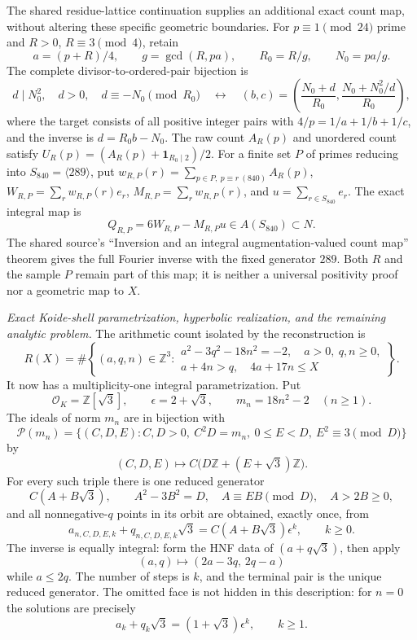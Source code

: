 \documentclass[10pt,letterpaper]{article}
\begin{document}
The shared residue-lattice continuation supplies an additional exact
count map, without altering these specific geometric boundaries.
For $p\equiv1\pmod{24}$ prime and $R>0$, $R\equiv3\pmod4$, retain
\[
 a=(p+R)/4,\qquad g=\gcd(R,pa),\qquad R_0=R/g,\qquad N_0=pa/g.
\]
The complete divisor-to-ordered-pair bijection is
\[
 d\mid N_0^2,\quad d>0,\quad d\equiv-N_0\pmod{R_0}
 \quad\longleftrightarrow\quad
 (b,c)=\left(\frac{N_0+d}{R_0},\frac{N_0+N_0^2/d}{R_0}\right),
\]
where the target consists of all positive integer pairs with
$4/p=1/a+1/b+1/c$, and the inverse is $d=R_0b-N_0$.
The raw count $A_R(p)$ and unordered count satisfy
$U_R(p)=(A_R(p)+\mathbf1_{R_0\mid2})/2$.
For a finite set $P$ of primes reducing into $S_{840}=\langle289\rangle$,
put $w_{R,P}(r)=\sum_{p\in P,\ p\equiv r\ (840)}A_R(p)$,
$W_{R,P}=\sum_r w_{R,P}(r)e_r$, $M_{R,P}=\sum_r w_{R,P}(r)$,
and $u=\sum_{r\in S_{840}}e_r$. The exact integral map is
\[
 Q_{R,P}=6W_{R,P}-M_{R,P}u\in A(S_{840})\subset N.
\]
The shared source's ``Inversion and an integral augmentation-valued
count map'' theorem gives the full Fourier inverse with the fixed
generator $289$. Both $R$ and the sample $P$ remain part of this map;
it is neither a universal positivity proof nor a geometric map to $X$.

\medskip\noindent
\textit{Exact Koide-shell parametrization, hyperbolic realization, and the
remaining analytic problem.}
The arithmetic count isolated by the reconstruction is
\[
 R(X)=\#\left\{(a,q,n)\in\mathbb Z^3:
 \begin{array}{c}
 a^2-3q^2-18n^2=-2,\quad a>0,\ q,n\geq0,\\
 a+4n>q,\quad 4a+17n\leq X
 \end{array}\right\}.
\]
It now has a multiplicity-one integral parametrization.  Put
\[
 \mathcal O_K=\mathbb Z[\sqrt3],\qquad
 \epsilon=2+\sqrt3,\qquad m_n=18n^2-2\quad(n\geq1).
\]
The ideals of norm $m_n$ are in bijection with
\[
 \mathcal P(m_n)=\{(C,D,E):C,D>0,\ C^2D=m_n,\ 0\leq E<D,
                         \ E^2\equiv3\pmod D\}
\]
by
\[
 (C,D,E)\longmapsto C\bigl(D\mathbb Z+(E+\sqrt3)\mathbb Z\bigr).
\]
For every such triple there is one reduced generator
\[
 C(A+B\sqrt3),\qquad
 A^2-3B^2=D,\quad A\equiv EB\pmod D,\quad A>2B\geq0,
\]
and all nonnegative-$q$ points in its orbit are obtained, exactly once, from
\[
 a_{n,C,D,E,k}+q_{n,C,D,E,k}\sqrt3
   =C(A+B\sqrt3)\epsilon^k,\qquad k\geq0.
\]
The inverse is equally integral: form the HNF data of
$(a+q\sqrt3)$, then apply
\[
 (a,q)\longmapsto(2a-3q,\,2q-a)
\]
while $a\leq2q$.  The number of steps is $k$, and the terminal pair is
the unique reduced generator.  The omitted face is not hidden in this
description: for $n=0$ the solutions are precisely
\[
 a_k+q_k\sqrt3=(1+\sqrt3)\epsilon^k,\qquad k\geq1.
\]
\end{document}
